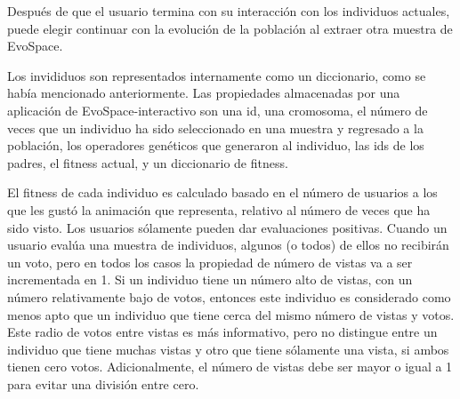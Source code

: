 \clearpage

Después de que el usuario termina con su interacción con los
individuos actuales, puede elegir continuar con la evolución de la
población al extraer otra muestra de EvoSpace.

Los invididuos son representados internamente como un diccionario,
como se había mencionado anteriormente. Las propiedades almacenadas
por una aplicación de EvoSpace-interactivo son una id, una cromosoma,
el número de veces que un individuo ha sido seleccionado en una
muestra y regresado a la población, los operadores genéticos que
generaron al individuo, las ids de los padres, el fitness actual, y un
diccionario de fitness.

El fitness de cada individuo es calculado basado en el número de
usuarios a los que les gustó la animación que representa, relativo al
número de veces que ha sido visto. Los usuarios sólamente pueden dar
evaluaciones positivas. Cuando un usuario evalúa una muestra de
individuos, algunos (o todos) de ellos no recibirán un voto, pero en
todos los casos la propiedad de número de vistas va a ser incrementada
en 1. Si un individuo tiene un número alto de vistas, con un número
relativamente bajo de votos, entonces este individuo es considerado
como menos apto que un individuo que tiene cerca del mismo número de
vistas y votos. Este radio de votos entre vistas es más informativo,
pero no distingue entre un individuo que tiene muchas vistas y otro
que tiene sólamente una vista, si ambos tienen cero
votos. Adicionalmente, el número de vistas debe ser mayor o igual a 1
para evitar una división entre cero.






